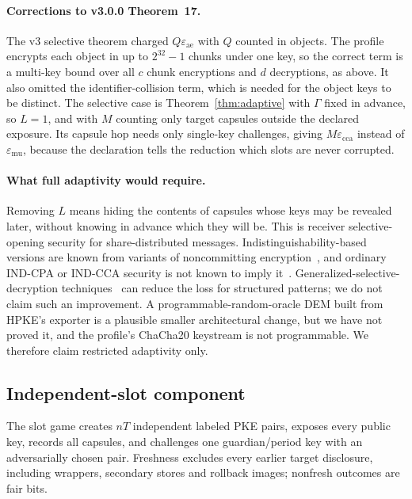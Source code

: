 \documentclass[pdflatex,sn-mathphys-num]{sn-jnl}
\theoremstyle{plain}
\theoremstyle{definition}
\begin{document}
\paragraph{Corrections to v3.0.0 Theorem~17.}
The v3 selective theorem charged $Q\varepsilon_{\mathrm{ae}}$ with $Q$ counted in objects. The profile encrypts each object in up to $2^{32}-1$ chunks under one key, so the correct term is a multi-key bound over all $c$ chunk encryptions and $d$ decryptions, as above. It also omitted the identifier-collision term, which is needed for the object keys to be distinct. The selective case is Theorem~\ref{thm:adaptive} with $\Gamma$ fixed in advance, so $L=1$, and with $M$ counting only target capsules outside the declared exposure. Its capsule hop needs only single-key challenges, giving $M\varepsilon_{\mathrm{cca}}$ instead of $\varepsilon_{\mathrm{mu}}$, because the declaration tells the reduction which slots are never corrupted.

\paragraph{What full adaptivity would require.}
Removing $L$ means hiding the contents of capsules whose keys may be revealed later, without knowing in advance which they will be. This is receiver selective-opening security for share-distributed messages. Indistinguishability-based versions are known from variants of noncommitting encryption~\cite{hazay2015,canetti1996}, and ordinary IND-CPA or IND-CCA security is not known to imply it~\cite{bellare2009}. Generalized-selective-decryption techniques~\cite{panjwani2007,jafargholi2017} can reduce the loss for structured patterns; we do not claim such an improvement. A programmable-random-oracle DEM built from HPKE's exporter is a plausible smaller architectural change, but we have not proved it, and the profile's ChaCha20 keystream is not programmable. We therefore claim restricted adaptivity only.

\subsection{Independent-slot component}\label{sec:slots}
The slot game creates $nT$ independent labeled PKE pairs, exposes every public key, records all capsules, and challenges one guardian/period key with an adversarially chosen pair. Freshness excludes every earlier target disclosure, including wrappers, secondary stores and rollback images; nonfresh outcomes are fair bits.
\end{document}

